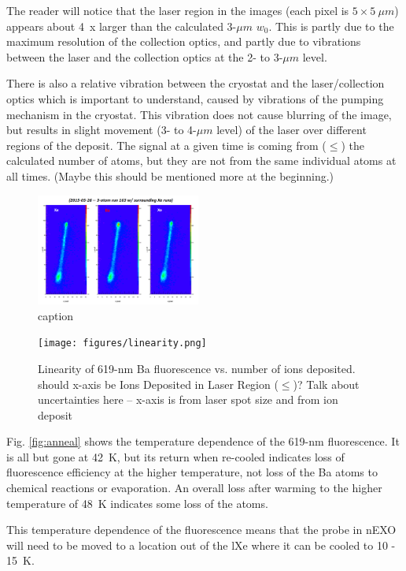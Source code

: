 \documentclass[aps,pra,reprint,superscriptaddress]{revtex4-1}
\begin{document}
The reader will notice that the laser region in the images (each pixel is $5\times5~\mu m$) appears about 4~x larger than the calculated {\color{red}3-$\mu m$} $w_{0}$.  This is partly due to the maximum resolution of the collection optics, and partly due to vibrations between the laser and the collection optics at the 2- to 3-$\mu m$ level.

There is also a relative vibration between the cryostat and the laser/collection optics which is important to understand, caused by vibrations of the pumping mechanism in the cryostat.  This vibration does not cause blurring of the image, but results in slight movement (3- to 4-$\mu m$ level) of the laser over different regions of the deposit.  The signal at a given time is coming from ($\leq$) the calculated number of atoms, but they are not from the same individual atoms at all times.  {\color{red}(Maybe this should be mentioned more at the beginning.)}

\begin{figure}
\includegraphics[width=0.48\textwidth]{figures/image_raw_3-atom_with_pre-post-.png}
\caption{caption}
\label{fig:raw}
\end{figure}

\begin{figure}
\texttt{[image: figures/linearity.png]}
\caption{Linearity of 619-nm Ba fluorescence vs. number of ions deposited.  {\color{red}should x-axis be Ions Deposited in Laser Region ($\leq$)?  Talk about uncertainties here -- x-axis is from laser spot size and from ion deposit}}
\label{fig:linearity}
\end{figure}

Fig. \ref{fig:anneal} shows the temperature dependence of the 619-nm fluorescence.  It is all but gone at 42~K, but its return when re-cooled indicates loss of fluorescence efficiency at the higher temperature, not loss of the Ba atoms to chemical reactions or evaporation.  An overall loss after warming to the higher temperature of 48~K indicates some loss of the atoms.

This temperature dependence of the fluorescence means that the probe in nEXO will need to be moved to a location out of the lXe where it can be cooled to 10 - 15~K.
\end{document}
